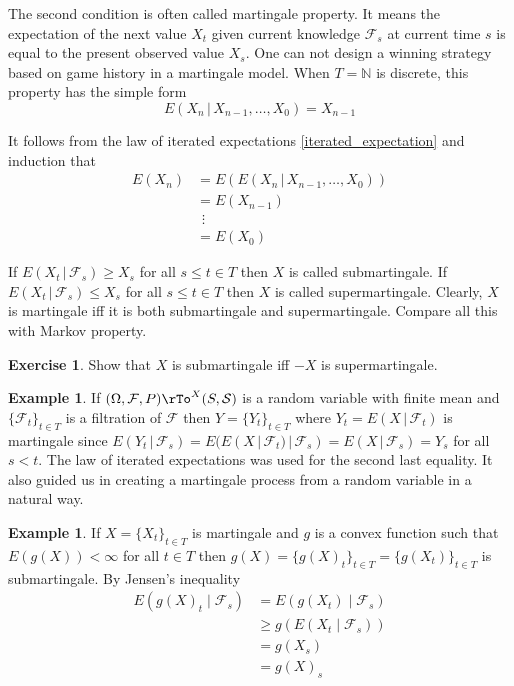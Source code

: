 \documentclass[12pt]{amsart}
\theoremstyle{definition}
\newtheorem{example}[theorem]{Example}
\newtheorem{exercise}[theorem]{Exercise}
\begin{document}
The second condition is often called martingale property. It means the expectation of the next value $X_t$ given current knowledge $\mathcal{F}_s$ at current time $s$ is equal to the present observed value $X_s$. One can not design a winning strategy based on game history in a martingale model. When $T = \mathbb{N}$ is discrete, this property has the simple form
$$E(X_n \,|\, X_{n-1}, \dots , X_0) = X_{n-1}$$

It follows from the law of iterated expectations \ref{iterated_expectation} and induction that
\begin{align*}
E(X_n) & = E(E(X_n \,|\, X_{n-1}, \dots , X_0)) \\
 & = E(X_{n-1}) \\
 & \hspace{5pt} \vdots \\
 & = E(X_0)
\end{align*}

If $E(X_t \,|\, \mathcal{F}_s) \geq X_s$ for all $s \leq t \in T$ then $X$ is called submartingale. If $E(X_t \,|\, \mathcal{F}_s) \leq X_s$ for all $s \leq t \in T$ then $X$ is called supermartingale. Clearly, $X$ is martingale iff it is both submartingale and supermartingale. Compare all this with Markov property.

\begin{exercise} Show that $X$ is submartingale iff $-X$ is supermartingale.
\end{exercise}

\begin{example} If $(\Omega, \mathcal{F}, P) \rTo^X (S, \mathcal{S})$ is a random variable with finite mean and $\{\mathcal{F}_t\}_{t \in T}$ is a filtration of $\mathcal{F}$ then $Y = \{Y_t\}_{t \in T}$ where $Y_t = E(X \,|\, \mathcal{F}_t)$ is martingale since $E(Y_t \,|\, \mathcal{F}_s) = E(E(X \,|\, \mathcal{F}_t) \,|\, \mathcal{F}_s) = E(X \,|\, \mathcal{F}_s) = Y_s$ for all $s < t$. The law of iterated expectations was used for the second last equality. It also guided us in creating a martingale process from a random variable in a natural way.
\end{example}

\begin{example} If $X = \{X_t\}_{t \in T}$ is martingale and $g$ is a convex function such that $E(g(X)) < \infty$ for all $t \in T$ then $g(X) = \{g(X)_t\}_{t \in T} = \{g(X_t)\}_{t \in T}$ is submartingale. By Jensen's inequality
\begin{align*}
E(g(X)_t \mid \mathcal{F}_s) & = E(g(X_t) \mid \mathcal{F}_s) \\
 & \geq g(E(X_t \mid \mathcal{F}_s)) \\
 & = g(X_s) \\
 & = g(X)_s
\end{align*}
\end{example}
\end{document}
